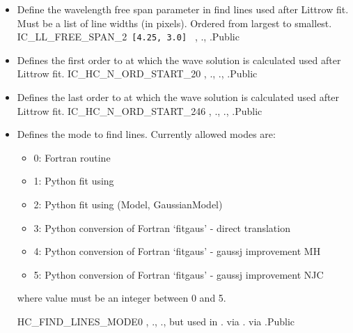 \begin{itemize}
\item {} 
{Define the wavelength free span parameter in find lines used after Littrow fit. Must be a list of line widths (in pixels). Ordered from largest to smallest.}
{IC\_LL\_FREE\_SPAN\_2}{\lstinline[style=pythoninline]| [4.25, 3.0] |}
{\calHC, \calWAVE}{\constantsfile}{\spirouTHORCA., \spirouTHORCA.}{Public}

\item {} 
{Defines the first order to at which the wave solution is calculated used after Littrow fit.}
{IC\_HC\_N\_ORD\_START\_2}{0}
{\calHC, \calWAVE}{\constantsfile}{\spirouTHORCA., \spirouTHORCA., \spirouWAVE.}{Public}

\item {} 
{Defines the last order to at which the wave solution is calculated used after Littrow fit.}
{IC\_HC\_N\_ORD\_START\_2}{46}
{\calHC, \calWAVE}{\constantsfile}{\spirouTHORCA., \spirouTHORCA., \spirouWAVE.}{Public}

\item {} 
\begin{minipage}[t]{\textwidth}
{Defines the mode to find lines. Currently allowed modes are:
\begin{itemize}
	\item 0: Fortran  routine
	\item 1: Python fit using 
	\item 2: Python fit using  (Model, GaussianModel)
	\item 3: Python conversion of Fortran `fitgaus' - direct translation
	\item 4: Python conversion of Fortran `fitgaus' - gaussj improvement MH
	\item 5: Python conversion of Fortran `fitgaus' - gaussj improvement NJC
\end{itemize}
where value must be an integer between 0 and 5.
}
{HC\_FIND\_LINES\_MODE}{0}
{\calHC, \calWAVE}{\constantsfile}{\calHC.\progMAIN, \calWAVE.\progMAIN, but used in \spirouTHORCA. via \spirouTHORCA. via \spirouTHORCA.}{Public}


\end{minipage}
\end{itemize}
